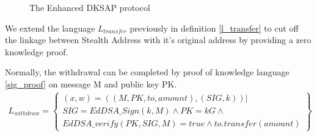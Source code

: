 \begin{figure}[H]
\centering
{}
\caption{The Enhanced DKSAP protocol}
\label{fig:edksap}
\end{figure}

We extend the language $L_{transfer}$ previously in definition \ref{l_transfer} to cut off the linkage between Stealth Address with it's original address by providing a zero knowledge proof.  

Normally, the withdrawal can be completed by proof of knowledge language \ref{sig_proof} on message M and public key PK.
\begin{equation}\label{sig_proof}
    \begin{aligned}
        L_{withdraw} = \left\{
                \begin{array}{c}
                        (x, w) = ((M, PK, to, amount), (SIG, k)) | \\ 
                    SIG = EdDSA\_Sign(k, M) \land PK = kG \land \\
                        EdDSA\_verify(PK, SIG, M) = true \land to.transfer(amount)
                \end{array}    
                    \right\} 
    \end{aligned}
\end{equation}

